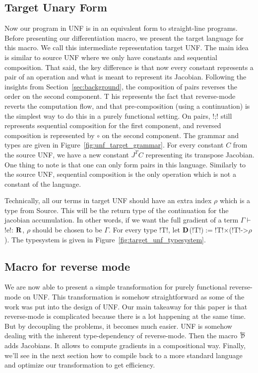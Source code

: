 

\subsection{Target Unary Form}

Now our program in UNF is in an equivalent form to straight-line programs. 
Before presenting our differentiation macro, we present the target language for this macro. 
We call this intermediate representation target UNF.
The main idea is similar to source UNF where we only have constants and sequential composition.
That said, the key difference is that now every constant represents a pair of an operation and what is meant to represent its Jacobian.
Following the insights from Section~\ref{sec:background}, the composition of pairs reverses the order on the second component. T
his represents the fact that reverse-mode reverts the computation flow, 
and that pre-composition (using a continuation) is the simplest way to do this in a purely functional setting.
On pairs, !;! still represents sequential composition for the first component, and reversed composition is represented by $\circ$ on the second component.
The grammar and types are given in Figure~\ref{fig:unf_target_grammar}. 
For every constant $C$ from the source UNF, we have a new constant $J^TC$ representing its transpose Jacobian.
One thing to note is that one can only form pairs in this language. 
Similarly to the source UNF, sequential composition is the only operation which is not a constant of the language.



Technically, all our terms in target UNF should have an extra index $\rho$ which is a type from Source.
This will be the return type of the continuation for the jacobian accumulation. 
In other words, if we want the full gradient of a term $\Gamma\vdash$!e!: $\mathbf{R}$, $\rho$ should be chosen to be $\Gamma$.
For every type !T!, let $\mathbf{D}$(!T!)$:=$!T!$\times$(!T!->$\rho$). 
The typesystem is given in Figure~\ref{fig:target_unf_typesystem}. 



\subsection{Macro for reverse mode}

We are now able to present a simple transformation for purely functional reverse-mode on UNF.
This transformation is somehow straightforward as some of the work was put into the design of UNF.
Our main takeaway for this paper is that reverse-mode is complicated because there is a lot happening at the same time. 
But by decoupling the problems, it becomes much easier. UNF is somehow dealing with the inherent type-dependency of reverse-mode.
Then the macro $\Dsynrevsymbol$ adds Jacobians. It allows to compute gradients in a compositional way.
Finally, we'll see in the next section how to compile back to a more standard language and optimize our transformation to get efficiency.

